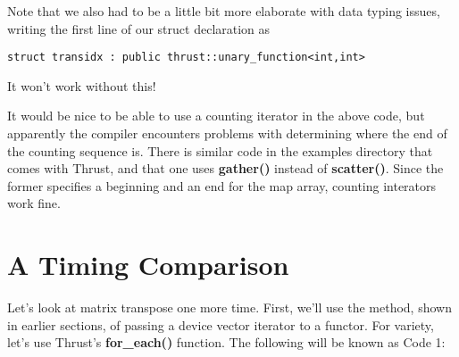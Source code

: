 Note that we also had to be a little bit more elaborate with data typing
issues, writing the first line of our struct declaration as

\begin{lstlisting}
struct transidx : public thrust::unary_function<int,int>
\end{lstlisting}

It won't work without this!

It would be nice to be able to use a counting iterator in the above
code, but apparently the compiler encounters problems with determining
where the end of the counting sequence is.  There is similar code in the
examples directory that comes with Thrust, and that one uses {\bf
gather()} instead of {\bf scatter()}.  Since the former specifies a
beginning and an end for the map array, counting interators work fine.

\section{A Timing Comparison}

Let's look at matrix transpose one more time.  First, we'll use the
method, shown in earlier sections, of passing a device vector iterator
to a functor.  For variety, let's use Thrust's {\bf for\_each()}
function.  The following will be known as Code 1:

